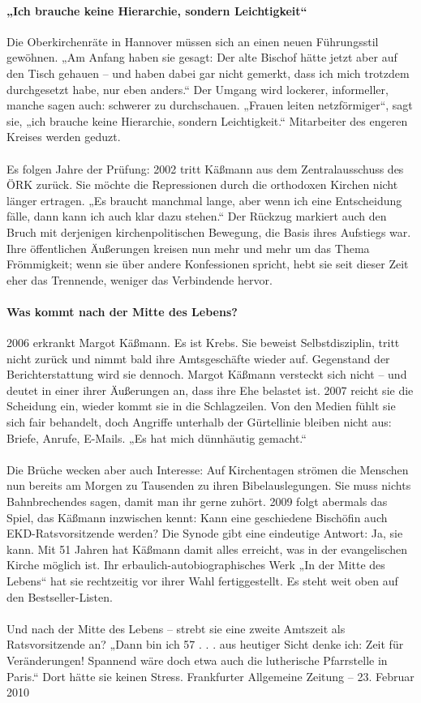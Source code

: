 \documentclass[a4paper,12pt,oneside]{scrbook}
\begin{document}
\paragraph{„Ich brauche keine Hierarchie, sondern Leichtigkeit“}
Die Oberkirchenräte in Hannover müssen sich an einen neuen Führungsstil gewöhnen. „Am Anfang haben sie gesagt: Der alte Bischof hätte jetzt aber auf den Tisch gehauen – und haben dabei gar nicht gemerkt, dass ich mich trotzdem durchgesetzt habe, nur eben anders.“ Der Umgang wird lockerer, informeller, manche sagen auch: schwerer zu durchschauen. „Frauen leiten netzförmiger“, sagt sie, „ich brauche keine Hierarchie, sondern Leichtigkeit.“ Mitarbeiter des engeren Kreises werden geduzt.
\\\\
Es folgen Jahre der Prüfung: 2002 tritt Käßmann aus dem Zentralausschuss des ÖRK zurück. Sie möchte die Repressionen durch die orthodoxen Kirchen nicht länger ertragen. „Es braucht manchmal lange, aber wenn ich eine Entscheidung fälle, dann kann ich auch klar dazu stehen.“ Der Rückzug markiert auch den Bruch mit derjenigen kirchenpolitischen Bewegung, die Basis ihres Aufstiegs war. Ihre öffentlichen Äußerungen kreisen nun mehr und mehr um das Thema Frömmigkeit; wenn sie über andere Konfessionen spricht, hebt sie seit dieser Zeit eher das Trennende, weniger das Verbindende hervor.
\paragraph{Was kommt nach der Mitte des Lebens?}
2006 erkrankt Margot Käßmann. Es ist Krebs. Sie beweist Selbstdisziplin, tritt nicht zurück und nimmt bald ihre Amtsgeschäfte wieder auf. Gegenstand der Berichterstattung wird sie dennoch. Margot Käßmann versteckt sich nicht – und deutet in einer ihrer Äußerungen an, dass ihre Ehe belastet ist. 2007 reicht sie die Scheidung ein, wieder kommt sie in die Schlagzeilen. Von den Medien fühlt sie sich fair behandelt, doch Angriffe unterhalb der Gürtellinie bleiben nicht aus: Briefe, Anrufe, E-Mails. „Es hat mich dünnhäutig gemacht.“
\\\\
Die Brüche wecken aber auch Interesse: Auf Kirchentagen strömen die Menschen nun bereits am Morgen zu Tausenden zu ihren Bibelauslegungen. Sie muss nichts Bahnbrechendes sagen, damit man ihr gerne zuhört. 2009 folgt abermals das Spiel, das Käßmann inzwischen kennt: Kann eine geschiedene Bischöfin auch EKD-Ratsvorsitzende werden? Die Synode gibt eine eindeutige Antwort: Ja, sie kann. Mit 51 Jahren hat Käßmann damit alles erreicht, was in der evangelischen Kirche möglich ist. Ihr erbaulich-autobiographisches Werk „In der Mitte des Lebens“ hat sie rechtzeitig vor ihrer Wahl fertiggestellt. Es steht weit oben auf den Bestseller-Listen.
\\\\
Und nach der Mitte des Lebens – strebt sie eine zweite Amtszeit als Ratsvorsitzende an? „Dann bin ich 57 . . . aus heutiger Sicht denke ich: Zeit für Veränderungen! Spannend wäre doch etwa auch die lutherische Pfarrstelle in Paris.“ Dort hätte sie keinen Stress.
\newpage
Frankfurter Allgemeine Zeitung \hfill -- \hfill 23. Februar 2010
\end{document}
